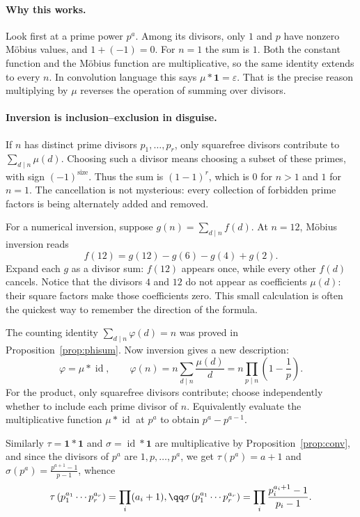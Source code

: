 \paragraph{Why this works.}
Look first at a prime power $p^a$. Among its divisors, only $1$ and $p$ have nonzero Möbius values, and $1+(-1)=0$. For $n=1$ the sum is $1$. Both the constant function and the Möbius function are multiplicative, so the same identity extends to every $n$. In convolution language this says $\mu*\mathbf1=\varepsilon$. That is the precise reason multiplying by $\mu$ reverses the operation of summing over divisors.

\paragraph{Inversion is inclusion--exclusion in disguise.}
If $n$ has distinct prime divisors $p_1,\dots,p_r$, only squarefree divisors
contribute to $\sum_{d\mid n}\mu(d)$. Choosing such a divisor means choosing
a subset of these primes, with sign $(-1)^{\text{size}}$. Thus the sum is
$(1-1)^r$, which is $0$ for $n>1$ and $1$ for $n=1$.
The cancellation is not mysterious: every collection of forbidden prime factors
is being alternately added and removed.

For a numerical inversion, suppose $g(n)=\sum_{d\mid n}f(d)$. At $n=12$,
M\"obius inversion reads
\[
 f(12)=g(12)-g(6)-g(4)+g(2).
\]
Expand each $g$ as a divisor sum: $f(12)$ appears once, while every other
$f(d)$ cancels. Notice that the divisors $4$ and $12$ do not appear as
coefficients $\mu(d)$: their square factors make those coefficients zero.
This small calculation is often the quickest way to remember the direction of
the formula.

The counting identity $\sum_{d\mid n}\varphi(d)=n$ was proved in
Proposition~\ref{prop:phisum}. Now inversion gives a new description:
\[
\varphi=\mu*\operatorname{id},\qquad
\varphi(n)=n\sum_{d\mid n}\frac{\mu(d)}d
=n\prod_{p\mid n}\left(1-\frac1p\right).
\]
For the product, only squarefree divisors contribute; choose independently
whether to include each prime divisor of $n$. Equivalently evaluate the
multiplicative function $\mu*\operatorname{id}$ at $p^a$ to obtain
$p^a-p^{a-1}$.

Similarly $\tau=\mathbf 1*\mathbf 1$ and $\sigma=\operatorname{id}*\mathbf 1$ are multiplicative by Proposition~\ref{prop:conv}, and since the divisors of $p^a$ are $1,p,\dots,p^a$, we get $\tau(p^a)=a+1$ and $\sigma(p^a)=\frac{p^{a+1}-1}{p-1}$, whence
\[
\begin{gathered}\tau\left(p_1^{a_1}\cdots p_r^{a_r}\right)=\prod_i(a_i+1),\qq\sigma\left(p_1^{a_1}\cdots p_r^{a_r}\right)=\prod_i\frac{p_i^{a_i+1}-1}{p_i-1}.\end{gathered}
\]

